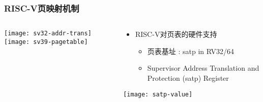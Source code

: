 \begin{frame}   
	\frametitle{RISC-V页映射机制}
	
	\begin{columns}[t]
		
		\begin{column}{.5\textwidth}
			
			\centering
			\texttt{[image: sv32-addr-trans]}
			\texttt{[image: sv39-pagetable]}
			
		\end{column}
		
		
		\begin{column}{.5\textwidth}
			
			\begin{itemize}\large
				\item RISC-V对页表的硬件支持
				\begin{itemize}
					\item 页表基址 : satp in RV32/64
					\item  Supervisor Address Translation and Protection (satp) Register
					
					
				\end{itemize}
			\end{itemize}
			\texttt{[image: satp-value]}
		\end{column}
		
		
	\end{columns}
	
\end{frame}



